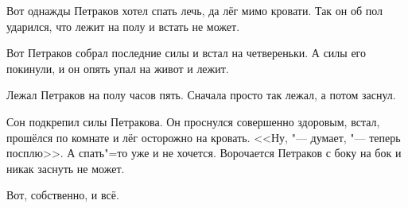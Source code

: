 Вот однажды Петраков хотел спать лечь, да лёг мимо кровати. Так он об пол ударился, что лежит на полу и встать не может.
 
Вот Петраков собрал последние силы и встал на четвереньки. А силы его покинули, и он опять упал на живот и лежит.
 
Лежал Петраков на полу часов пять. Сначала просто так лежал, а потом заснул.
 
Сон подкрепил силы Петракова. Он проснулся совершенно здоровым, встал, прошёлся по комнате и лёг осторожно на кровать. <<Ну, "--- думает, "--- теперь посплю>>. А спать"=то уже и не хочется. Ворочается Петраков с боку на бок и никак заснуть не может.
 
Вот, собственно, и всё.